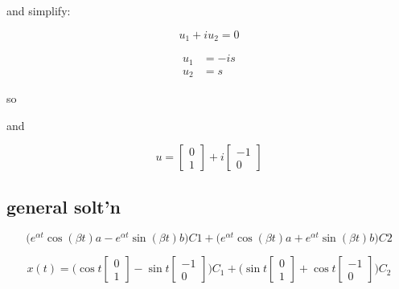 \documentclass[twocolumn,draft]{article}
\begin{document}
  and simplify:
  
  \begin{equation*}
	  \boxed{u_{1} + iu_{2} = 0}
  \end{equation*}
  
  \begin{align*}
 	u_{1} &= -is \\
	u_{2} &= s
  \end{align*}
  
  so
  
  
  and
  
  \begin{equation}
  	u = \begin{bmatrix}
  		0 \\ 1
  	\end{bmatrix} + i \begin{bmatrix}
  						-1 \\ 0
  					  \end{bmatrix}
  \end{equation}
  
  \subsection*{general solt'n}
  
  \begin{equation}
  	\Big(e^{\alpha t}\cos{(\beta t)}a - e^{\alpha t}\sin{(\beta t)}b\Big)C1 +
	\Big(e^{\alpha t}\cos{(\beta t)}a + e^{\alpha t}\sin{(\beta t)}b\Big)C2
  \end{equation}
  
  \begin{equation*}
  	x(t) = \Big(\cos{t \begin{bmatrix}
  						0 \\ 1
  						\end{bmatrix}}
				- \sin{t \begin{bmatrix}
							-1 \\ 0
							\end{bmatrix}}\Big)C_{1}
		 +
		 \Big(\sin{t \begin{bmatrix}
		   						0 \\ 1
		   						\end{bmatrix}}
		 				+ \cos{t \begin{bmatrix}
		 							-1 \\ 0
		 							\end{bmatrix}}\Big)C_{2}
  \end{equation*}
  
\end{document}
